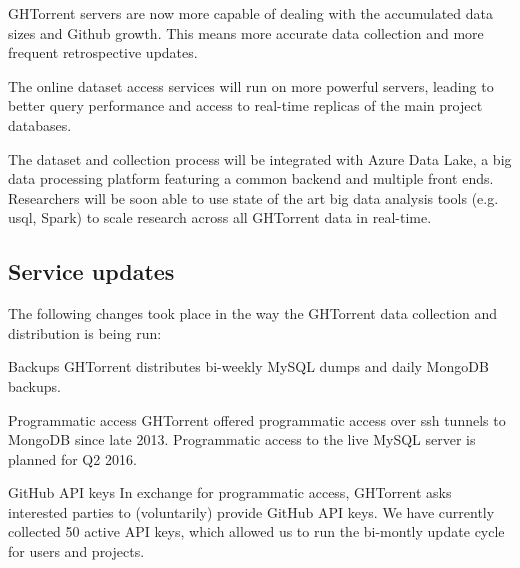\documentclass{sig-alternate}
\begin{document}
\begin{compactitem}

  \item GHTorrent servers are now more capable of dealing with the accumulated
    data sizes and Github growth. This means more accurate data collection
    and more frequent retrospective updates.

  \item The online dataset access services will run on more powerful servers,
    leading to better query performance and access to real-time replicas of
    the main project databases.

  \item The dataset and collection process will be integrated with Azure
    Data Lake, a big data processing platform featuring a common backend
    and multiple front ends. Researchers will be soon able to use state
    of the art big data analysis tools (e.g. {\sc usql}, Spark) to scale
    research across all GHTorrent data in real-time.

\end{compactitem}


\subsection{Service updates}

The following changes took place in the way the GHTorrent data collection
and distribution is being run:

\begin{compactdesc}

  \item[Backups] GHTorrent distributes bi-weekly MySQL dumps and daily MongoDB
    backups.

  \item[Programmatic access] GHTorrent offered programmatic access over
    {\sc ssh} tunnels to MongoDB since late 2013. Programmatic access to the
    live MySQL server is planned for Q2 2016.

  \item[GitHub API keys] In exchange for programmatic access, GHTorrent asks
    interested parties to (voluntarily) provide GitHub API keys. We have
    currently collected 50 active API keys, which allowed us to run the
    bi-montly update cycle for users and projects.

\end{compactdesc}

\end{document}
